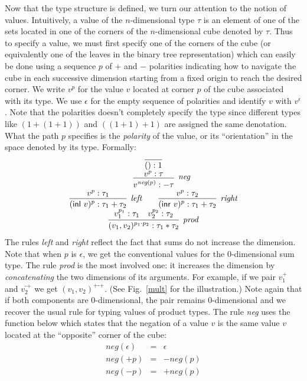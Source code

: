\documentclass[authoryear,preprint]{sigplanconf}
\newcommand{\mm}{\texttt{-}}
\newcommand{\pp}{\texttt{+}}
\newcommand{\negp}[1]{\textit{neg}(#1)}
\newcommand{\inl}[1]{\textsf{inl}~#1}
\newcommand{\inr}[1]{\textsf{inr}~#1}
\begin{document}
Now that the type structure is defined, we turn our attention to the notion
of values. Intuitively, a value of the $n$-dimensional type $\tau$ is an
element of one of the sets located in one of the corners of the
$n$-dimensional cube denoted by $\tau$. Thus to specify a value, we must
first specify one of the corners of the cube (or equivalently one of the
leaves in the binary tree representation) which can easily be done using a
sequence $p$ of $+$ and $-$ polarities indicating how to navigate the cube in
each successive dimension starting from a fixed origin to reach the desired
corner. We write $v^{p}$ for the value $v$ located at corner $p$ of the cube
associated with its type. We use $\epsilon$ for the empty sequence of
polarities and identify $v$ with $v^\epsilon$. Note that the polarities
doesn't completely specify the type since different types like $(1+(1+1))$
and $((1+1)+1)$ are assigned the same denotation. What the path $p$ specifies
is the \emph{polarity} of the value, or its ``orientation'' in the space
denoted by its type. Formally:
\[\begin{array}{c}
\infer{() : 1}{} \\
\qquad
\infer[\textit{neg}]{v^{\negp{p}} : - \tau}{v^p : \tau} 
\\
\infer[\textit{left}]{(\inl{v})^{p} : \tau_1 + \tau_2}{v^{p} : \tau_1}
\qquad
\infer[\textit{right}]{(\inr{v})^{p} : \tau_1 + \tau_2}{v^{p} : \tau_2} 
\\
\infer[\textit{prod}]{(v_1,v_2)^{p_1 \cdot p_2} : \tau_1 * \tau_2}
      {v_1^{p_1} : \tau_1 & v_2^{p_2} : \tau_2} 
\end{array}\]
The rules \textit{left} and \textit{right} reflect the fact that sums do not
increase the dimension. Note that when $p$ is $\epsilon$, we get the
conventional values for the 0-dimensional sum type. The rule \textit{prod} is
the most involved one: it increases the dimension by \emph{concatenating} the
two dimensions of its arguments. For example, if we pair $v_1^{\pp}$ and
$v_2^{\mm\pp}$ we get $(v_1,v_2)^{\pp\mm\pp}$. (See Fig.~\ref{mult} for the
illustration.) Note again that if both components are 0-dimensional, the pair
remains 0-dimensional and we recover the usual rule for typing values of
product types. The rule \textit{neg} uses the function below which states
that the negation of a value $v$ is the same value $v$ located at the
``opposite'' corner of the cube:
\[\begin{array}{rcl}
\negp{\epsilon} &=& \epsilon \\
\negp{+p} &=& -\negp{p} \\
\negp{-p} &=& +\negp{p}
\end{array}\]
\end{document}
